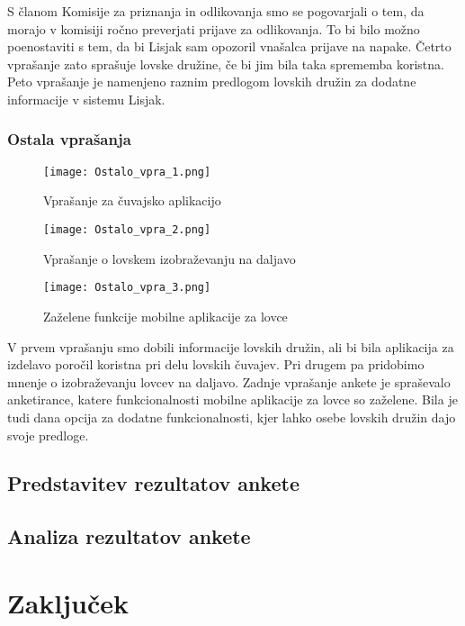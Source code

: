\documentclass[a4paper,12pt,openright]{book}
\begin{document}
S članom Komisije za priznanja in odlikovanja smo se pogovarjali o tem, da morajo v komisiji ročno preverjati prijave za odlikovanja.
To bi bilo možno poenostaviti s tem, da bi Lisjak sam opozoril vnašalca prijave na napake.
Četrto vprašanje zato sprašuje lovske družine, če bi jim bila taka sprememba koristna.
Peto vprašanje je namenjeno raznim predlogom lovskih družin za dodatne informacije v sistemu Lisjak.

\newpage
\subsection{Ostala vprašanja}

\begin{figure}[H]
    \centering
    \texttt{[image: Ostalo\_vpra\_1.png]}
    \caption{Vprašanje za čuvajsko aplikacijo}
\end{figure}


\begin{figure}[H]
    \centering
    \texttt{[image: Ostalo\_vpra\_2.png]}
    \caption{Vprašanje o lovskem izobraževanju na daljavo}
\end{figure}

\begin{figure}[H]
    \centering
    \texttt{[image: Ostalo\_vpra\_3.png]}
    \caption{Zaželene funkcije mobilne aplikacije za lovce}
\end{figure}

V prvem vprašanju smo dobili informacije lovskih družin, ali bi bila aplikacija za izdelavo poročil koristna pri delu lovskih čuvajev.
Pri drugem pa pridobimo mnenje o izobraževanju lovcev na daljavo.
Zadnje vprašanje ankete je spraševalo anketirance, katere funkcionalnosti mobilne aplikacije za lovce so zaželene.
Bila je tudi dana opcija za dodatne funkcionalnosti, kjer lahko osebe lovskih družin dajo svoje predloge.


\section{Predstavitev rezultatov ankete}

\section{Analiza rezultatov ankete}


\chapter{Zaključek}  
\label{end}


\cleardoublepage


\printbibliography[heading=bibintoc]
\end{document}
